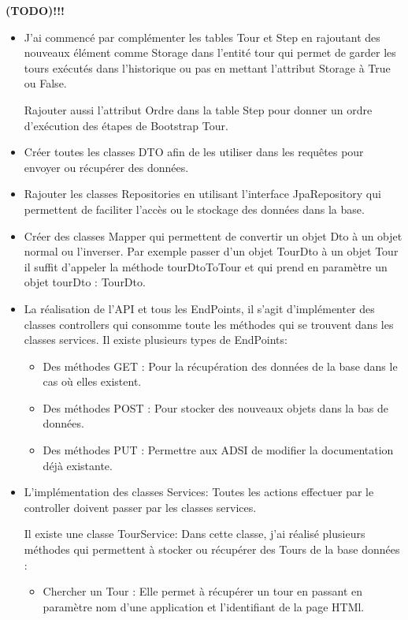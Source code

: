 \documentclass[12pt]{article}
\begin{document}
\textbf{(TODO)!!!}\newline
\begin{itemize}

\item J'ai commencé par complémenter les tables Tour et Step en rajoutant des nouveaux élément comme Storage dans l'entité tour qui permet de garder les tours exécutés dans l'historique ou pas en mettant l’attribut Storage à True ou False. 

Rajouter aussi l'attribut Ordre dans la table Step pour donner un ordre d’exécution des étapes de Bootstrap Tour. 
  
  

\item Créer toutes les classes DTO afin de les utiliser dans les requêtes  pour envoyer ou récupérer des données.

\item Rajouter les classes Repositories en utilisant l'interface JpaRepository qui permettent de faciliter l'accès ou le stockage des données dans la base.

\item Créer des classes Mapper qui permettent de convertir un objet Dto à un objet normal ou l'inverser. Par exemple passer d'un objet TourDto à un objet Tour il suffit d'appeler la méthode tourDtoToTour et qui prend en paramètre un objet tourDto : TourDto.  

\item La réalisation de l'API et tous les EndPoints, il s'agit d’implémenter des classes controllers qui consomme toute les méthodes qui se trouvent dans les classes services. Il existe plusieurs types de EndPoints: 
\begin{itemize}
\item Des méthodes GET : Pour la récupération des données de la base dans le cas où elles existent.

\item Des méthodes POST : Pour stocker des nouveaux objets dans la bas de données.

\item Des méthodes PUT : Permettre aux ADSI de modifier la documentation déjà existante. 

\end{itemize}
\item L'implémentation des classes Services: Toutes les actions effectuer par le controller doivent passer par les classes services. 

Il existe une classe TourService: Dans cette classe, j'ai réalisé plusieurs méthodes qui permettent à stocker ou récupérer des Tours de la base données : 
\begin{itemize}
\item Chercher un Tour : Elle permet à récupérer un tour en passant en paramètre nom d'une application et l'identifiant de la page HTMl. 


\end{itemize}
\end{itemize}
\end{document}
